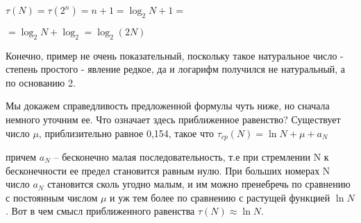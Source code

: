 \documentclass{article}
\begin{document}
\begin{multicols}{3}
\noindent
\small{
\begin{math}
   \tau(N) = \tau(2^n) = n + 1 = \log_2 N + 1 = 
\end{math}
}

\begin{math}
 = \log_2 N + \log_2 = \log_2(2N)
\end{math}

Конечно, пример не очень показательный, поскольку такое натуральное число - степень простого - явление редкое, да и логарифм получился не натуральный, а по основанию 2.

Мы докажем справедливость предложенной формулы чуть ниже, но сначала немного уточним ее. Что означает здесь приближенное равенство? Существует число \begin{math}
    \mu
\end{math}, приблизительно равное 0,154, такое что
\small{
\begin{math}
    \tau_{cp}(N) = \ln N + \mu + a_N
\end{math}
}

\noindent причем \begin{math} a_N \end{math} -- бесконечно малая последовательность, т.е при стремлении N к бесконечности ее предел становится равным нулю. При больших номерах N число \begin{math}
    a_N
\end{math} становится сколь угодно малым, и им можно пренебречь по сравнению с постоянным числом \begin{math}\mu\end{math} и уж тем более по сравнению с растущей функцией \begin{math}\ln N\end{math}. 
Вот в чем смысл приближенного равенства \begin{math}
    \tau(N) \approx \ln N
\end{math}.
\end{multicols}
\end{document}
